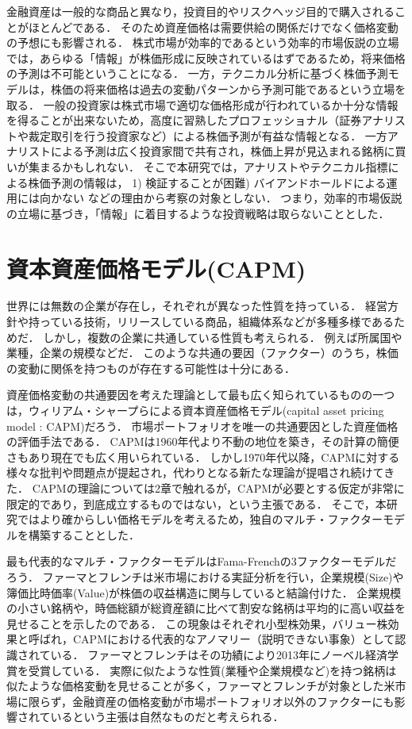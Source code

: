 \documentclass[11pt]{jreport}
\begin{document}
金融資産は一般的な商品と異なり，投資目的やリスクヘッジ目的で購入されることがほとんどである．
そのため資産価格は需要供給の関係だけでなく価格変動の予想にも影響される．
株式市場が効率的であるという効率的市場仮説の立場では，あらゆる「情報」が株価形成に反映されているはずであるため，将来価格の予測は不可能ということになる．
一方，テクニカル分析に基づく株価予測モデルは，株価の将来価格は過去の変動パターンから予測可能であるという立場を取る．
一般の投資家は株式市場で適切な価格形成が行われているか十分な情報を得ることが出来ないため，高度に習熟したプロフェッショナル（証券アナリストや裁定取引を行う投資家など）による株価予測が有益な情報となる．
一方アナリストによる予測は広く投資家間で共有され，株価上昇が見込まれる銘柄に買いが集まるかもしれない．
そこで本研究では，アナリストやテクニカル指標による株価予測の情報は，
1) 検証することが困難) バイアンドホールドによる運用には向かない\quad
などの理由から考察の対象としない．
つまり，効率的市場仮説の立場に基づき，「情報」に着目するような投資戦略は取らないこととした．


\section{資本資産価格モデル(CAPM)}
世界には無数の企業が存在し，それぞれが異なった性質を持っている．
経営方針や持っている技術，リリースしている商品，組織体系などが多種多様であるためだ．
しかし，複数の企業に共通している性質も考えられる．
例えば所属国や業種，企業の規模などだ．
このような共通の要因（ファクター）のうち，株価の変動に関係を持つものが存在する可能性は十分にある．

資産価格変動の共通要因を考えた理論として最も広く知られているものの一つは，ウィリアム・シャープらによる資本資産価格モデル(capital asset pricing model : CAPM)だろう．
市場ポートフォリオを唯一の共通要因とした資産価格の評価手法である．
CAPMは1960年代より不動の地位を築き，その計算の簡便さもあり現在でも広く用いられている．
しかし1970年代以降，CAPMに対する様々な批判や問題点が提起され，代わりとなる新たな理論が提唱され続けてきた．
CAPMの理論については2章で触れるが，CAPMが必要とする仮定が非常に限定的であり，到底成立するものではない，という主張である．
そこで，本研究ではより確からしい価格モデルを考えるため，独自のマルチ・ファクターモデルを構築することとした．

最も代表的なマルチ・ファクターモデルはFama-Frenchの3ファクターモデル\cite{Fama}だろう．
ファーマとフレンチは米市場における実証分析を行い，企業規模(Size)や簿価比時価率(Value)が株価の収益構造に関与していると結論付けた．
企業規模の小さい銘柄や，時価総額が総資産額に比べて割安な銘柄は平均的に高い収益を見せることを示したのである．
この現象はそれぞれ小型株効果，バリュー株効果と呼ばれ，CAPMにおける代表的なアノマリー（説明できない事象）として認識されている．
ファーマとフレンチはその功績により2013年にノーベル経済学賞を受賞している．
実際に似たような性質(業種や企業規模など)を持つ銘柄は似たような価格変動を見せることが多く，ファーマとフレンチが対象とした米市場に限らず，金融資産の価格変動が市場ポートフォリオ以外のファクターにも影響されているという主張は自然なものだと考えられる．
\end{document}
